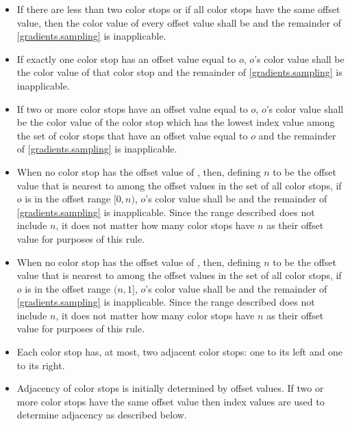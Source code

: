\begin{itemize}
\item If there are less than two color stops or if all color stops have the same offset value, then the color value of every offset value shall be  and the remainder of \ref{gradients.sampling} is inapplicable.

\item If exactly one color stop has an offset value equal to $o$, $o$'s color value shall be the color value of that color stop and the remainder of \ref{gradients.sampling} is inapplicable.

\item If two or more color stops have an offset value equal to $o$, $o$'s color value shall be the color value of the color stop which has the lowest index value among the set of color stops that have an offset value equal to $o$ and the remainder of \ref{gradients.sampling} is inapplicable.

\item When no color stop has the offset value of , then, defining $n$ to be the offset value that is nearest to  among the offset values in the set of all color stops, if $o$ is in the offset range $[0, n)$, $o$'s color value shall be  and the remainder of \ref{gradients.sampling} is inapplicable.
\enternote
Since the range described does not include $n$, it does not matter how many color stops have $n$ as their offset value for purposes of this rule.
\exitnote

\item When no color stop has the offset value of , then, defining $n$ to be the offset value that is nearest to  among the offset values in the set of all color stops, if $o$ is in the offset range $(n, 1]$, $o$'s color value shall be  and the remainder of \ref{gradients.sampling} is inapplicable.
\enternote
Since the range described does not include $n$, it does not matter how many color stops have $n$ as their offset value for purposes of this rule.
\exitnote

\item Each color stop has, at most, two adjacent color stops: one to its left and one to its right.

\item Adjacency of color stops is initially determined by offset values. If two or more color stops have the same offset value then index values are used to determine adjacency as described below.


\end{itemize}
